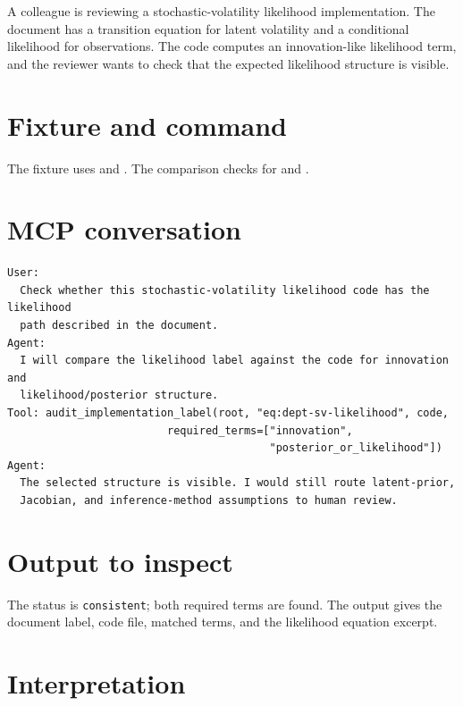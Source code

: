 \documentclass[12pt,a4paper,openany]{book}
\begin{document}
A colleague is reviewing a stochastic-volatility likelihood implementation. The
document has a transition equation for latent volatility and a conditional
likelihood for observations. The code computes an innovation-like likelihood
term, and the reviewer wants to check that the expected likelihood structure is
visible.

\section*{Fixture and command}

The fixture uses  and
. The comparison checks
 for  and
.

\section*{MCP conversation}

\begin{lstlisting}[basicstyle=\ttfamily\scriptsize]
User:
  Check whether this stochastic-volatility likelihood code has the likelihood
  path described in the document.
Agent:
  I will compare the likelihood label against the code for innovation and
  likelihood/posterior structure.
Tool: audit_implementation_label(root, "eq:dept-sv-likelihood", code,
                         required_terms=["innovation",
                                         "posterior_or_likelihood"])
Agent:
  The selected structure is visible. I would still route latent-prior,
  Jacobian, and inference-method assumptions to human review.
\end{lstlisting}



\section*{Output to inspect}

The status is \texttt{consistent}; both required terms are found. The output gives the
document label, code file, matched terms, and the likelihood equation excerpt.

\section*{Interpretation}
\end{document}
